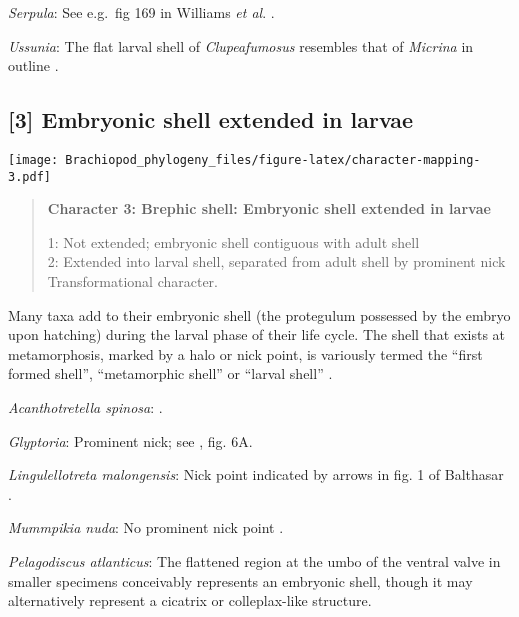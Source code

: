 \documentclass[openany]{book}
\theoremstyle{definition}
\theoremstyle{definition}
\theoremstyle{definition}
\theoremstyle{remark}
\begin{document}
\hypertarget{Serpula-coding-2}{}
\emph{Serpula}: See e.g.~fig 169 in Williams \emph{et al}.
\citeyearpar{Williams1997Introduction}.

\hypertarget{Ussunia-coding-2}{}
\emph{Ussunia}: The flat larval shell of \emph{Clupeafumosus} resembles
that of \emph{Micrina} in outline
\citetext{\citealp{Topper2013Reappraisalof}; \citealp[cf.][]{Holmer2011Firstrecord}}.

\subsection*{{[}3{]} Embryonic shell extended in
larvae}\label{embryonic-shell-extended-in-larvae}

\texttt{[image: Brachiopod\_phylogeny\_files/figure-latex/character-mapping-3.pdf]}

\begin{quote}
\textbf{Character 3: Brephic shell: Embryonic shell extended in larvae}

1: Not extended; embryonic shell contiguous with adult shell\\
2: Extended into larval shell, separated from adult shell by prominent
nick\\
Transformational character.
\end{quote}

Many taxa add to their embryonic shell (the protegulum possessed by the
embryo upon hatching) during the larval phase of their life cycle. The
shell that exists at metamorphosis, marked by a halo or nick point, is
variously termed the ``first formed shell'', ``metamorphic shell'' or
``larval shell'' \citep{Bassett2017Earliestontogeny}.

\hypertarget{Acanthotretella_spinosa-coding-3}{}
\emph{Acanthotretella spinosa}: \citet{Wanninger2002C}.

\hypertarget{Glyptoria-coding-3}{}
\emph{Glyptoria}: Prominent nick; see \citet{Freeman1999Changesin}, fig.
6A.

\hypertarget{Lingulellotreta_malongensis-coding-3}{}
\emph{Lingulellotreta malongensis}: Nick point indicated by arrows in
fig. 1 of Balthasar \citeyearpar{Balthasar2009Thebrachiopod}.

\hypertarget{Mummpikia_nuda-coding-3}{}
\emph{Mummpikia nuda}: No prominent nick point
\citep{Holmer1997EarlyCambrian, Li2004}.

\hypertarget{Pelagodiscus_atlanticus-coding-3}{}
\emph{Pelagodiscus atlanticus}: The flattened region at the umbo of the
ventral valve in smaller specimens conceivably represents an embryonic
shell, though it may alternatively represent a cicatrix or
colleplax-like structure.
\end{document}
